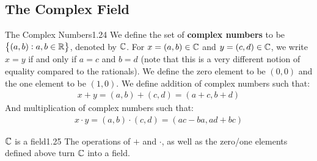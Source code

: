\subsection{The Complex Field}
\setcounter{rudin}{23}
\begin{definition}{The Complex Numbers}{1.24}
    We define the set of \textbf{complex numbers} to be $\set{(a, b): a, b \in \mathbb{R}}$, denoted by $\mathbb{C}$. For $x = (a, b) \in \mathbb{C}$ and $y = (c, d) \in \mathbb{C}$, we write $x = y$ if and only if $a = c$ and $b = d$ (note that this is a very different notion of equality compared to the rationals). We define the zero element to be $(0, 0)$ and the one element to be $(1, 0)$. We define addition of complex numbers such that:
    \begin{align*}
        x + y = (a, b) + (c, d) = (a + c, b + d)
    \end{align*}
    And multiplication of complex numbers such that:
    \begin{align*}
        x\cdot y = (a, b)\cdot (c, d) = (ac - ba, ad + bc)
    \end{align*}
\end{definition}
\begin{theorem}{$\mathbb{C}$ is a field}{1.25}
    The operations of $+$ and $\cdot$, as well as the zero/one elements defined above turn $\mathbb{C}$ into a field. 
\end{theorem}
